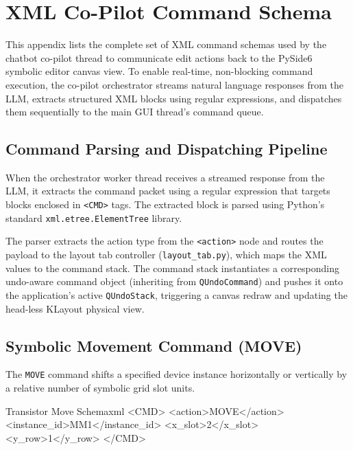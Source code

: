 
\chapter{XML Co-Pilot Command Schema}
\label{app:xml_commands}

\noindent
This appendix lists the complete set of XML command schemas used by the chatbot co-pilot thread to communicate edit actions back to the PySide6 symbolic editor canvas view. To enable real-time, non-blocking command execution, the co-pilot orchestrator streams natural language responses from the LLM, extracts structured XML blocks using regular expressions, and dispatches them sequentially to the main GUI thread's command queue.

\section{Command Parsing and Dispatching Pipeline}
\noindent
When the orchestrator worker thread receives a streamed response from the LLM, it extracts the command packet using a regular expression that targets blocks enclosed in \texttt{<CMD>} tags. The extracted block is parsed using Python's standard \texttt{xml.etree.ElementTree} library. 

\noindent
The parser extracts the action type from the \texttt{<action>} node and routes the payload to the layout tab controller (\texttt{layout\_tab.py}), which maps the XML values to the command stack. The command stack instantiates a corresponding undo-aware command object (inheriting from \texttt{QUndoCommand}) and pushes it onto the application's active \texttt{QUndoStack}, triggering a canvas redraw and updating the head-less KLayout physical view.

\section{Symbolic Movement Command (MOVE)}
\noindent
The \texttt{MOVE} command shifts a specified device instance horizontally or vertically by a relative number of symbolic grid slot units.
\begin{thesiscode}{Transistor Move Schema}{xml}
<CMD>
  <action>MOVE</action>
  <instance_id>MM1</instance_id>
  <x_slot>2</x_slot>
  <y_row>1</y_row>
</CMD>
\end{thesiscode}

